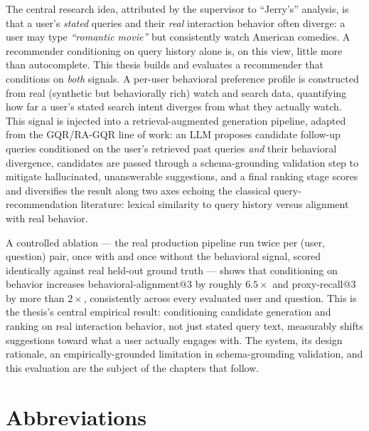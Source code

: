 \documentclass[11pt,a4paper,oneside]{book}
\begin{document}
The central research idea, attributed by the supervisor to ``Jerry's'' analysis, is that a user's
\emph{stated} queries and their \emph{real} interaction behavior often diverge: a user may type
\emph{``romantic movie''} but consistently watch American comedies. A recommender conditioning on
query history alone is, on this view, little more than autocomplete. This thesis builds and
evaluates a recommender that conditions on \emph{both} signals. A per-user behavioral preference
profile is constructed from real (synthetic but behaviorally rich) watch and search data,
quantifying how far a user's stated search intent diverges from what they actually watch. This
signal is injected into a retrieval-augmented generation pipeline, adapted from the GQR/RA-GQR
line of work: an LLM proposes candidate follow-up queries conditioned on the user's retrieved past
queries \emph{and} their behavioral divergence, candidates are passed through a schema-grounding
validation step to mitigate hallucinated, unanswerable suggestions, and a final ranking stage
scores and diversifies the result along two axes echoing the classical query-recommendation
literature: lexical similarity to query history versus alignment with real behavior.

A controlled ablation --- the real production pipeline run twice per (user, question) pair, once
with and once without the behavioral signal, scored identically against real held-out ground truth
--- shows that conditioning on behavior increases behavioral-alignment@3 by roughly $6.5\times$ and
proxy-recall@3 by more than $2\times$, consistently across every evaluated user and question. This
is the thesis's central empirical result: conditioning candidate generation and ranking on real
interaction behavior, not just stated query text, measurably shifts suggestions toward what a user
actually engages with. The system, its design rationale, an empirically-grounded limitation in
schema-grounding validation, and this evaluation are the subject of the chapters that follow.

\tableofcontents
\listoffigures
\listoftables

\chapter*{Abbreviations}
\end{document}
